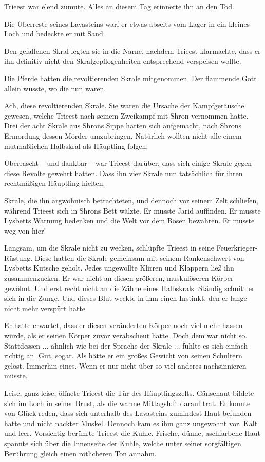 Trieest war elend zumute. Alles an diesem Tag erinnerte ihn an den Tod.

Die Überreste seines Lavasteins warf er etwas abseits vom Lager in ein kleines Loch und bedeckte er mit Sand.

Den gefallenen Skral legten sie in die Narne, nachdem Trieest klarmachte, dass er ihn definitiv nicht den Skralgepflogenheiten entsprechend verspeisen wollte.

Die Pferde hatten die revoltierenden Skrale mitgenommen. Der flammende Gott allein wusste, wo die nun waren.

Ach, diese revoltierenden Skrale. Sie waren die Ursache der Kampfgeräusche gewesen, welche Trieest nach seinem Zweikampf mit Shron vernommen hatte. Drei der acht Skrale aus Shrons Sippe hatten sich aufgemacht, nach Shrons Ermordung dessen Mörder umzubringen. Natürlich wollten nicht alle einem mutmaßlichen Halbskral als Häuptling folgen.

Überrascht – und dankbar – war Trieest darüber, dass sich einige Skrale gegen diese Revolte gewehrt hatten. Dass ihn vier Skrale nun tatsächlich für ihren rechtmäßigen Häuptling hielten.

Skrale, die ihn argwöhnisch betrachteten, und dennoch vor seinem Zelt schliefen, während Trieest sich in Shrons Bett wälzte. Er musste Jarid auffinden. Er musste Lysbetts Warnung bedenken und die Welt vor dem Bösen bewahren. Er musste weg von hier!

Langsam, um die Skrale nicht zu wecken, schlüpfte Trieest in seine Feuerkrieger-Rüstung. Diese hatten die Skrale gemeinsam mit seinem Rankenschwert von Lysbetts Kutsche geholt. Jedes ungewollte Klirren und Klappern ließ ihn zusammenzucken. Er war nicht an diesen größeren, muskulöseren Körper gewöhnt. Und erst recht nicht an die Zähne eines Halbskrals. Ständig schnitt er sich in die Zunge. Und dieses Blut weckte in ihm einen Instinkt, den er lange nicht mehr verspürt hatte

Er hatte erwartet, dass er diesen veränderten Körper noch viel mehr hassen würde, als er seinen Körper zuvor verabscheut hatte. Doch dem war nicht so. Stattdessen ... ähnlich wie bei der Sprache der Skrale ... fühlte es sich einfach richtig an. Gut, sogar. Als hätte er ein großes Gewicht von seinen Schultern gelöst. Immerhin eines. Wenn er nur nicht über so viel anderes nachsinnieren müsste.

Leise, ganz leise, öffnete Trieest die Tür des Häuptlingszelts. Gänsehaut bildete sich im Loch in seiner Brust, als die warme Mittagsluft darauf trat. Er konnte von Glück reden, dass sich unterhalb des Lavasteins zumindest Haut befunden hatte und nicht nackter Muskel. Dennoch kam es ihm ganz ungewohnt vor. Kalt und leer. Vorsichtig berührte Trieest die Kuhle. Frische, dünne, aschfarbene Haut spannte sich über die Innenseite der Kuhle, welche unter seiner sorgfältigen Berührung gleich einen rötlicheren Ton annahm.

